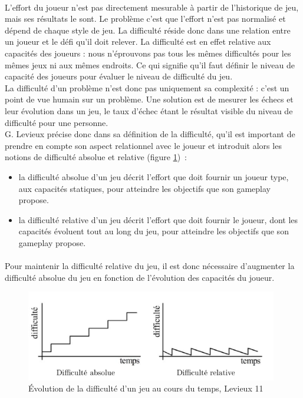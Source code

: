 \paragraph{}L’effort du joueur n’est pas directement mesurable à partir de l’historique de jeu, mais ses résultats le sont. Le problème c’est que l’effort n’est pas normalisé et dépend de chaque style de jeu. La difficulté réside donc dans une relation entre un joueur et le défi qu’il doit relever. La difficulté est en effet relative aux capacités des joueurs : nous n’éprouvons pas tous les mêmes difficultés pour les mêmes jeux ni aux mêmes endroits. Ce qui signifie qu’il faut définir le niveau de capacité des joueurs pour évaluer le niveau de difficulté du jeu.\\
La difficulté d’un problème n'est donc pas uniquement sa complexité : c’est un point de vue humain sur un problème. Une solution est de mesurer les échecs et leur évolution dans un jeu, le taux d’échec étant le résultat visible du niveau de difficulté pour une personne.\\

G. Levieux précise donc dans sa définition de la difficulté, qu’il est important de prendre en compte son aspect relationnel avec le joueur et introduit alors les notions de difficulté absolue et relative (figure \ref{evolution_difficulte})~:
	\begin{itemize}
		\item la difficulté absolue d’un jeu décrit l’effort que doit fournir un joueur type, aux capacités statiques, pour atteindre les objectifs que son gameplay propose. 
		\item la difficulté relative d’un jeu décrit l’effort que doit fournir le joueur, dont les capacités évoluent tout au long du jeu, pour atteindre les objectifs que son gameplay propose.
	\end{itemize}
\paragraph{}Pour maintenir la difficulté relative du jeu, il est donc nécessaire d’augmenter la difficulté absolue du jeu en fonction de l’évolution des capacités du joueur.

\begin{figure}[!htbp]
	\centering
	\includegraphics[width=11cm]{images/evolution_difficulte.png}
	\caption{Évolution de la difficulté d'un jeu au cours du temps, Levieux 11\cite{Levi11}}
	\label{evolution_difficulte}
\end{figure}

